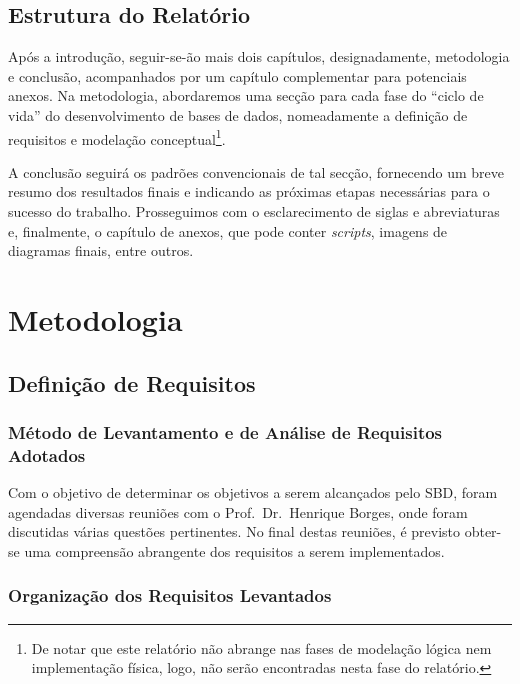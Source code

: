 \documentclass[a4paper,12pt]{scrreprt}
\begin{document}
    \section{Estrutura do Relatório}

    Após a introdução, seguir-se-ão mais dois capítulos, designadamente, metodologia e conclusão,
    acompanhados por um capítulo complementar para potenciais anexos.
    Na metodologia, abordaremos uma secção para cada fase do ``ciclo de vida'' do desenvolvimento de bases de dados,
    nomeadamente a definição de requisitos e modelação conceptual\footnote{De notar que este relat\'orio n\~ao abrange nas fases de modela\c{c}\~ao
        l\'ogica nem implementa\c{c}\~ao f\'isica, logo, n\~ao ser\~ao encontradas nesta fase do relat\'orio.}.
        
    A conclusão seguirá os padrões convencionais de tal secção, fornecendo um breve
    resumo dos resultados finais e indicando as próximas etapas necessárias para o sucesso do trabalho.
    Prosseguimos com o esclarecimento de siglas e abreviaturas e, finalmente, o capítulo de anexos,
    que pode conter \textit{scripts}, imagens de diagramas finais, entre outros.
        
\chapter{Metodologia}
    \section{Defini\c{c}\~ao de Requisitos}
        \subsection{M\'etodo de Levantamento e de An\'alise de Requisitos Adotados}
        Com o objetivo de determinar os objetivos a serem alcançados pelo SBD,
        foram agendadas diversas reuniões com o Prof.\ Dr.\ Henrique Borges, onde foram discutidas
        várias questões pertinentes. No final destas reuniões, é previsto obter-se uma compreensão
        abrangente dos requisitos a serem implementados.
        \subsection{Organiza\c{c}\~ao dos Requisitos Levantados}
\end{document}
